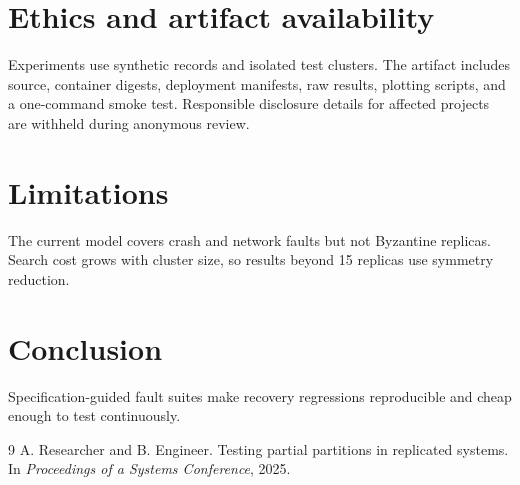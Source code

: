 \documentclass[10pt,twocolumn]{article}
\begin{document}
\section{Ethics and artifact availability}
Experiments use synthetic records and isolated test clusters. The artifact
includes source, container digests, deployment manifests, raw results, plotting
scripts, and a one-command smoke test. Responsible disclosure details for
affected projects are withheld during anonymous review.

\section{Limitations}
The current model covers crash and network faults but not Byzantine replicas.
Search cost grows with cluster size, so results beyond 15 replicas use symmetry
reduction.

\section{Conclusion}
Specification-guided fault suites make recovery regressions reproducible and
cheap enough to test continuously.

\begin{thebibliography}{9}
 A. Researcher and B. Engineer.
Testing partial partitions in replicated systems.
In \textit{Proceedings of a Systems Conference}, 2025.
\end{thebibliography}
\end{document}
